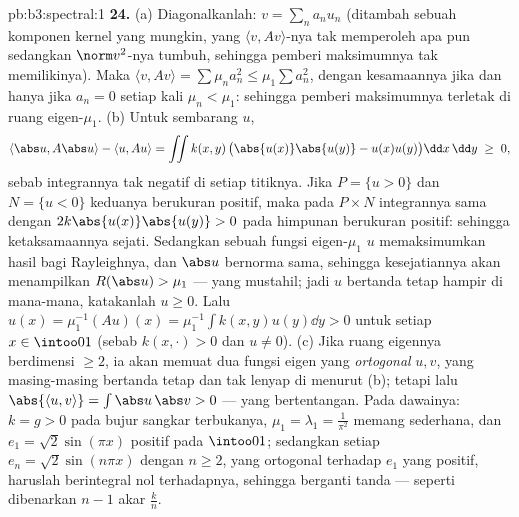 \begin{solution}{pb:b3:spectral:1}
\textbf{24.} (a) Diagonalkanlah: $v = \sum_na_nu_n$ (ditambah sebuah
komponen kernel yang mungkin, yang $\langle v, Av\rangle$-nya tak memperoleh
apa pun sedangkan $\norm v^2$-nya tumbuh, sehingga pemberi maksimumnya tak
memilikinya). Maka $\langle v, Av\rangle = \sum\mu_na_n^2 \leq
\mu_1\sum a_n^2$, dengan kesamaannya jika dan hanya jika $a_n = 0$ setiap kali
$\mu_n < \mu_1$: sehingga pemberi maksimumnya terletak di
ruang eigen-$\mu_1$. (b) Untuk sembarang $u$,
\[
\langle\abs u, A\abs u\rangle - \langle u, Au\rangle
= \iint k(x,y)\,\bigl(\abs{u(x)}\abs{u(y)} -
u(x)u(y)\bigr)\dd x\,\dd y \;\geq\; 0,
\]
sebab integrannya tak negatif di setiap titiknya. Jika $P = \{u >
0\}$ dan $N = \{u < 0\}$ keduanya berukuran positif, maka pada
$P\times N$ integrannya sama dengan $2k\abs{u(x)}\abs{u(y)} >
0$ pada himpunan berukuran positif: sehingga ketaksamaannya sejati. Sedangkan
sebuah fungsi eigen-$\mu_1$ $u$ memaksimumkan hasil bagi Rayleighnya,
dan $\abs u$ bernorma sama, sehingga kesejatiannya akan menampilkan
$R(\abs u) > \mu_1$ --- yang mustahil; jadi $u$ bertanda tetap
hampir di mana-mana, katakanlah $u \geq 0$. Lalu $u(x) = \mu_1^{-1}(Au)(x) =
\mu_1^{-1}\int k(x,y)u(y)\dd y > 0$ untuk setiap $x \in
\intoo01$ (sebab $k(x,\cdot) > 0$ dan $u \neq 0$). (c) Jika
ruang eigennya berdimensi $\geq 2$, ia akan memuat dua
fungsi eigen yang \emph{ortogonal} $u, v$, yang masing-masing bertanda tetap
dan tak lenyap di  menurut (b); tetapi lalu
$\abs{\langle u, v\rangle} = \int\abs u\,\abs v > 0$ ---
yang bertentangan. Pada dawainya: $k = g > 0$ pada bujur sangkar
terbukanya, $\mu_1 = \lambda_1 = \frac1{\pi^2}$ memang
sederhana, dan $e_1 = \sqrt2\sin(\pi x)$ positif pada
$\intoo01$; sedangkan setiap $e_n = \sqrt2\sin(n\pi x)$ dengan $n \geq 2$,
yang ortogonal terhadap $e_1$ yang positif, haruslah berintegral nol
terhadapnya, sehingga berganti tanda --- seperti dibenarkan $n - 1$ akar
 $\frac kn$.


\end{solution}
